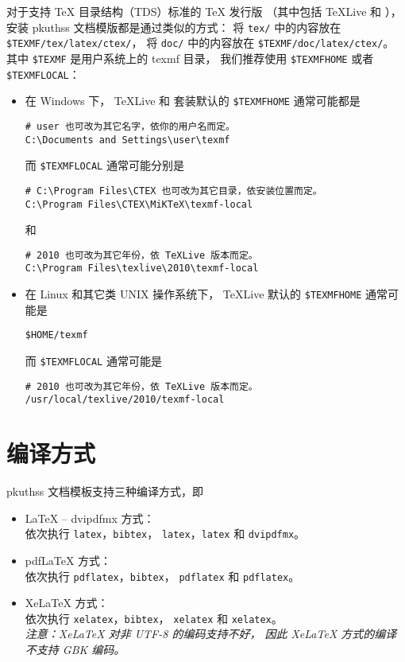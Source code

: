 	对于支持 \TeX{} 目录结构（TDS）标准的 \TeX{} 发行版%
	（其中包括 \TeX{}Live 和 \CTeX{}），
	安装 pkuthss 文档模版都是通过类似的方式：
	将 \verb|tex/| 中的内容放在 \verb|$TEXMF/tex/latex/ctex/|，
	将 \verb|doc/| 中的内容放在 \verb|$TEXMF/doc/latex/ctex/|。
	其中 \verb|$TEXMF| 是用户系统上的 texmf 目录，
	我们推荐使用 \verb|$TEXMFHOME| 或者 \verb|$TEXMFLOCAL|：
	\begin{itemize}
		\item 在 Windows 下，
			\TeX{}Live 和 \CTeX{} 套装默认的 \verb|$TEXMFHOME| %
			通常可能都是
\begin{Verbatim}[frame=single]
# user 也可改为其它名字，依你的用户名而定。
C:\Documents and Settings\user\texmf
\end{Verbatim}
			而 \verb|$TEXMFLOCAL| 通常可能分别是
\begin{Verbatim}[frame=single]
# C:\Program Files\CTEX 也可改为其它目录，依安装位置而定。
C:\Program Files\CTEX\MiKTeX\texmf-local
\end{Verbatim}
			和
\begin{Verbatim}[frame=single]
# 2010 也可改为其它年份，依 TeXLive 版本而定。
C:\Program Files\texlive\2010\texmf-local
\end{Verbatim}
		\item 在 Linux 和其它类 UNIX 操作系统下，
			\TeX{}Live 默认的 \verb|$TEXMFHOME| 通常可能是
\begin{Verbatim}[frame=single]
$HOME/texmf
\end{Verbatim}
			而 \verb|$TEXMFLOCAL| 通常可能是
\begin{Verbatim}[frame=single]
# 2010 也可改为其它年份，依 TeXLive 版本而定。
/usr/local/texlive/2010/texmf-local
\end{Verbatim}
	\end{itemize}

	\section{编译方式}

	pkuthss 文档模板支持三种编译方式，即
	\begin{itemize}
		\item \LaTeX{} -- dvipdfmx 方式：\\
			依次执行 \verb|latex|，\verb|bibtex|，%
			\verb|latex|，\verb|latex| 和 \verb|dvipdfmx|。
		\item pdf\LaTeX{} 方式：\\
			依次执行 \verb|pdflatex|，\verb|bibtex|，%
			\verb|pdflatex| 和 \verb|pdflatex|。
		\item Xe\LaTeX{} 方式：\\
			依次执行 \verb|xelatex|，\verb|bibtex|，%
			\verb|xelatex| 和 \verb|xelatex|。\\
			\emph{%
				注意：Xe\LaTeX{} 对非 UTF-8 的编码支持不好，
				因此 Xe\LaTeX{} 方式的编译不支持 GBK 编码。
			}
	\end{itemize}

